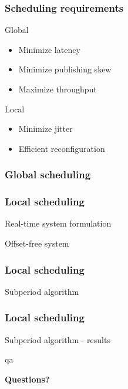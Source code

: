 \documentclass[]{prezentare}
\begin{document}
\begin{frame}
	\frametitle{Scheduling requirements}
	\begin{block}{Global}
		\begin{itemize}
			\item Minimize latency
			\item Minimize publishing skew
			\item Maximize throughput
		\end{itemize}
	\end{block}

	\begin{block}{Local}
		\begin{itemize}
			\item Minimize jitter
			\item Efficient reconfiguration
		\end{itemize}
	\end{block}
\end{frame}
\begin{frame}
	\frametitle{Global scheduling}
	\begin{block}
	
	\end{block}
\end{frame}
\begin{frame}
	\frametitle{Local scheduling}
	\begin{block}{Real-time system formulation}
	
	\end{block}
	\begin{block}{Offset-free system}
	
	\end{block}
\end{frame}
\begin{frame}
	\frametitle{Local scheduling}
	\begin{block}{Subperiod algorithm}
		
	\end{block}
\end{frame}
\begin{frame}
	\frametitle{Local scheduling}
	\begin{block}{Subperiod algorithm - results}
	
	\end{block}
\end{frame}
    \begin{frame}

    \begin{beamercolorbox}[rounded=true,shadow=true]{qa}
    \begin{center}
        {\Huge \textbf{Questions?}}
    \end{center}
    \end{beamercolorbox}
    \end{frame}
\end{document}
